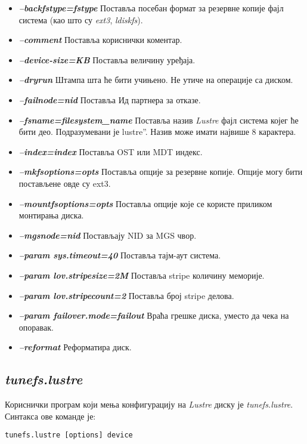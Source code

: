\begin{itemize}
\item \textbf{\textit{--backfstype=fstype }}
Поставља посебан формат за резервне копије фајл система (као што су \textit{ext3}, \textit{ldiskfs}).
\item \textbf{\textit{ --comment }}
Поставља кориснички коментар.
\item \textbf{\textit{--device-size=KB }}
Поставља величину уређаја.
\item \textbf{\textit{--dryrun }}
Штампа шта ће бити учињено. Не утиче на операције са диском.
\item \textbf{\textit{--failnode=nid }}
Поставља Ид партнера за отказе.
\item \textbf{\textit{--fsname=filesystem\_name }}
Поставља назив   \textit{Lustre} фајл система којег ће бити део. Подразумевани је \zn lustre”. Назив може имати највише 8 карактера.
\item \textbf{\textit{--index=index }}
Поставља OST или MDT индекс.
\item \textbf{\textit{--mkfsoptions=opts }}
Поставља опције за резервне копије.  Опције могу бити постављене овде су ext3.
\item \textbf{\textit{--mountfsoptions=opts} }
Поставља опције које се користе приликом монтирања диска.
\item \textbf{\textit{--mgsnode=nid }}
Постављају NID за MGS чвор.
\item \textbf{\textit{--param sys.timeout=40 }}
Поставља тајм-аут система.
\item \textbf{ \textit{--param lov.stripesize=2M }}
Поставља stripe количину меморије.
\item \textbf{\textit{--param lov.stripecount=2 }}
Поставља број stripe делова.
\item \textbf{\textit{--param failover.mode=failout }}
Враћа грешке диска, уместо да чека на опоравак.
\item \textbf{\textit{--reformat }}
Реформатира диск.

\end{itemize}

\subsection{\textit{tunefs.lustre}}

Кориснички програм који мења конфигурацију на   \textit{Lustre} диску је \textit{tunefs.lustre}.
Синтакса ове команде је:
\begin{verbatim}
tunefs.lustre [options] device
\end{verbatim}

